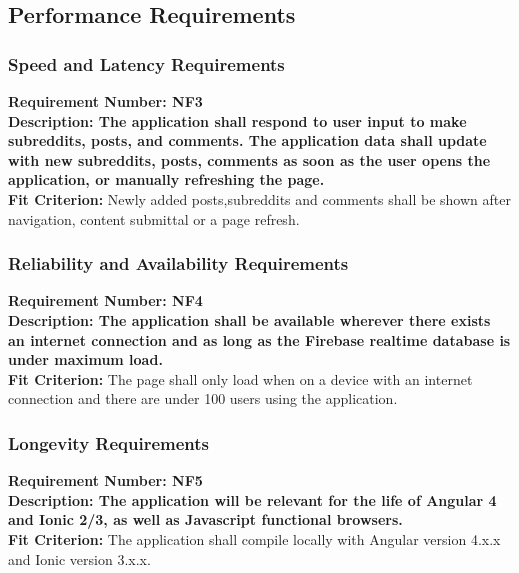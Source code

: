 \documentclass[12pt,fleqn]{article}
\begin{document}
\subsection {Performance Requirements}
\subsubsection {Speed and Latency Requirements}
\begin{tcolorbox}
\textbf{Requirement Number: NF3} \\
\textbf{Description:
The application shall respond to user input to make subreddits, posts, and comments. The application data shall update with new subreddits, posts, comments as soon as the user opens the application, or manually refreshing the page.} \\
{\color{red} \textbf{Fit Criterion:} Newly added posts,subreddits and comments shall be shown after navigation, content submittal or a page refresh. }
\end{tcolorbox}

\subsubsection{Reliability and Availability Requirements}
\begin{tcolorbox}
\textbf{Requirement Number: NF4} \\
\textbf{Description:
The application shall be available wherever there exists an internet connection and as long as the Firebase realtime database is under maximum load.} \\
{\color{red}\textbf{Fit Criterion:} The page shall only load when on a device with an internet connection and there are under 100 users using the application.}
\end{tcolorbox}

\subsubsection{Longevity Requirements}
\begin{tcolorbox}
\textbf{Requirement Number: NF5} \\
\textbf{Description:
The application will be relevant for the life of Angular 4 and Ionic 2/3, as well as Javascript functional browsers.} \\
{\color{red}\textbf{Fit Criterion:} The application shall compile locally with Angular version 4.x.x and Ionic version 3.x.x.}
\end{tcolorbox}
\end{document}

